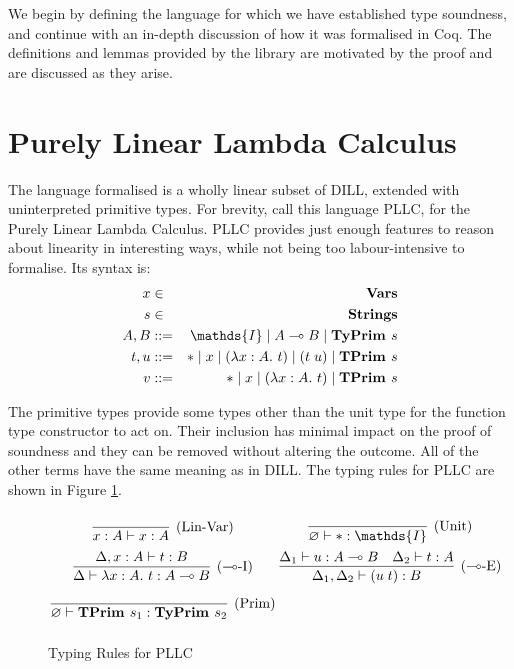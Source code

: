 \documentclass[]{unswthesis}
\let\emptyset\varnothing
\newcommand{\lam}[1]{\lambda #1 \ldotp \,}
\newcommand{\app}[2]{(#1 \; #2)}
\newcommand{\lolly}{\multimap}
\newcommand{\types}{\vdash}
\newcommand{\sor}{\; | \;}
\newcommand{\TyPrim}[1]{\b{TyPrim } #1}
\newcommand{\TPrim}[1]{\b{TPrim } #1}
\let\b\textbf
\let\t\text
\begin{document}
We begin by defining the language for which we have established type soundness, and continue with an in-depth discussion of how it was formalised in Coq. The definitions and lemmas provided by the library are motivated by the proof and are discussed as they arise.

\section{Purely Linear Lambda Calculus}

The language formalised is a wholly linear subset of DILL, extended with uninterpreted primitive types. For brevity, call this language PLLC, for the Purely Linear Lambda Calculus. PLLC provides just enough features to reason about linearity in interesting ways, while not being too labour-intensive to formalise. Its syntax is:
\begin{eqnarray*}
x & \in & \b{Vars} \\
s & \in & \b{Strings} \\
A,B & ::= & \mathds{I} \sor A \lolly B \sor \TyPrim{s} \\
t,u & ::= & * \sor x \sor (\lam{x : A} t) \sor \app{t}{u} \sor \TPrim{s} \\
v & ::= & * \sor x \sor (\lam{x : A} t) \sor \TPrim{s}
\end{eqnarray*}

The primitive types provide some types other than the unit type for the function type constructor to act on. Their inclusion has minimal impact on the proof of soundness and they can be removed without altering the outcome. All of the other terms have the same meaning as in DILL. The typing rules for PLLC are shown in Figure \ref{pllc-typing-rules}.

\begin{figure}[h]
\caption{Typing Rules for PLLC}
\label{pllc-typing-rules}
\begin{displaymath}
\arraycolsep=1.4pt\def\arraystretch{2.2}
\begin{array}{cc}
\infer[\text{(Lin-Var)}]{x : A \types x : A}{} &
\infer[\text{(Unit)}]{\emptyset \types * : \mathds{I}}{} \\
\infer[\text{($\lolly$-I)}]
  {\Delta \types \lam{x : A} t : A \lolly B}
  {\Delta, x : A \types t : B} &
\infer[\text{($\lolly$-E)}]
  {\Delta_1, \Delta_2 \types \app{u}{t} : B}
  {\Delta_1 \types u : A \lolly B  & \Delta_2 \types t : A} \\
\infer[\t{(Prim)}]{\emptyset \types \TPrim{s_1} : \TyPrim{s_2}}{} \\
\end{array}
\end{displaymath}
\end{figure}
\end{document}
